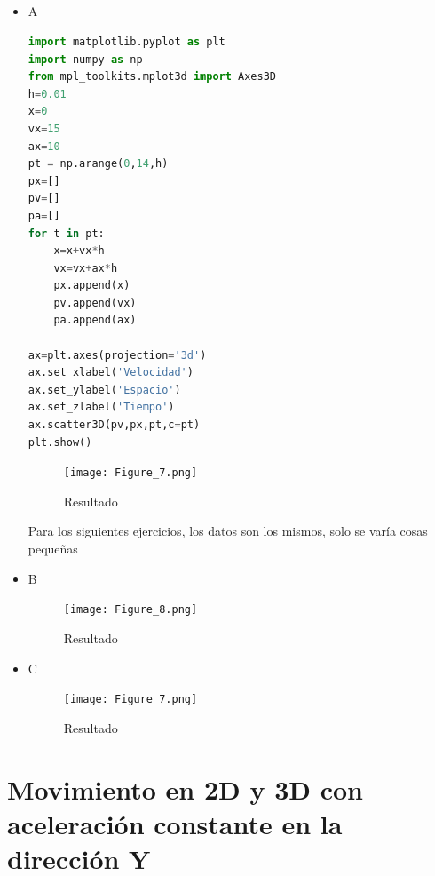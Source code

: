 \documentclass{article}
\begin{document}
\subsection{}
\begin{itemize}
    \item A
\begin{lstlisting}[language=Python,caption=Ejercicio 2.2]
import matplotlib.pyplot as plt
import numpy as np
from mpl_toolkits.mplot3d import Axes3D
h=0.01
x=0
vx=15
ax=10
pt = np.arange(0,14,h)
px=[]
pv=[]
pa=[]
for t in pt:
    x=x+vx*h
    vx=vx+ax*h
    px.append(x)
    pv.append(vx)
    pa.append(ax)
    
ax=plt.axes(projection='3d')
ax.set_xlabel('Velocidad')
ax.set_ylabel('Espacio')
ax.set_zlabel('Tiempo')
ax.scatter3D(pv,px,pt,c=pt)
plt.show()
\end{lstlisting}
\begin{figure}[H]
    \centering
    \texttt{[image: Figure\_7.png]}
    \caption{Resultado}
\end{figure}

Para los siguientes ejercicios, los datos son los mismos, solo se varía cosas pequeñas
    \item B

\begin{figure}[H]
    \centering
    \texttt{[image: Figure\_8.png]}
    \caption{Resultado}
\end{figure}

    \item C
\begin{figure}[H]
    \centering
    \texttt{[image: Figure\_7.png]}
    \caption{Resultado}
\end{figure}

\end{itemize}

\section{Movimiento en 2D y 3D con aceleración constante en la dirección Y}
\end{document}
